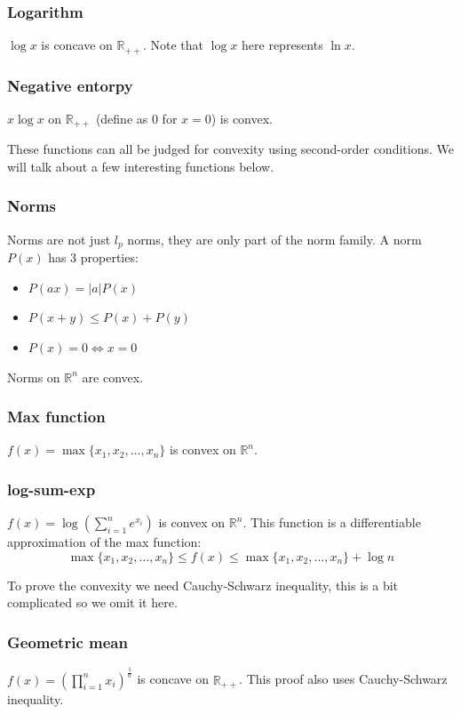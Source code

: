 \documentclass[lang=en,color=blue,mode=fancy,titlestyle=hang]{elegantbook}
\begin{document}
\subsubsection{Logarithm} $\log x$ is concave on $\mathbb{R}_{++}$. Note that $\log x$ here
represents $\ln x$.

\subsubsection{Negative entorpy} $x\log x$ on $\mathbb{R}_{++}$ (define as 0 for $x = 0$)
is convex.

These functions can all be judged for convexity using second-order conditions. We will
talk about a few interesting functions below.

\subsubsection{Norms} Norms are not just $l_p$ norms, they are only part of the norm family.
A norm $P(x)$ has 3 properties:
\begin{itemize}
  \item $P(ax) = |a|P(x)$
  \item $P(x + y) \leq P(x) + P(y)$
  \item $P(x) = 0 \Leftrightarrow x = 0$
\end{itemize}

Norms on $\mathbb{R}^n$ are convex.

\subsubsection{Max function} $f(x) = \max\{x_1, x_2, \ldots, x_n\}$ is convex on $\mathbb{R}^n$.

\subsubsection{log-sum-exp} $f(x) = \log(\sum_{i=1}^{n}e^{x_i})$ is convex on $\mathbb{R}^n$.
This function is a differentiable approximation of the max function:
\[
\max\{x_1, x_2, \ldots, x_n\} \leq f(x) \leq \max\{x_1, x_2, \ldots, x_n\} + \log n
\]

To prove the convexity we need Cauchy-Schwarz inequality, this is a bit complicated so we
omit it here.

\subsubsection{Geometric mean} $f(x) = (\prod_{i = 1}^n x_i)^{\frac{1}{n}}$ is concave on
$\mathbb{R}_{++}$. This proof also uses Cauchy-Schwarz inequality.
\end{document}
